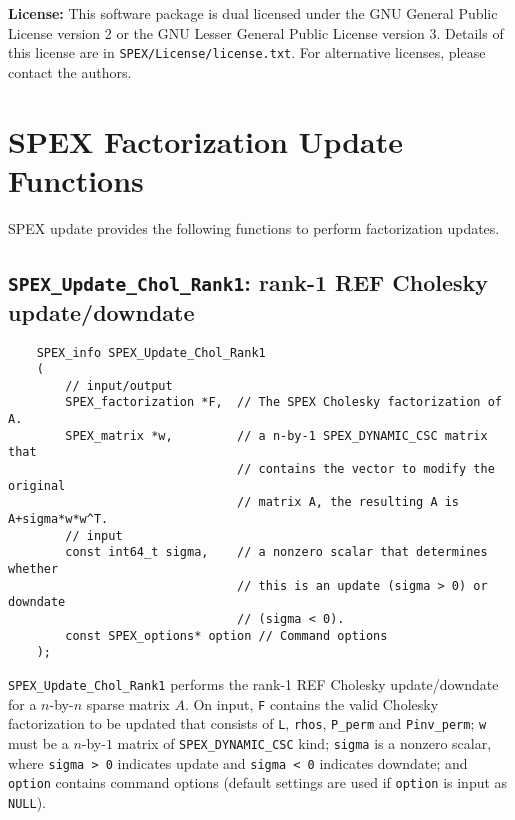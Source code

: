 \documentclass[12pt]{report}
\theoremstyle{definition}
\begin{document}
{\noindent \textbf{License:} This software package is dual licensed under the GNU General Public License version 2 or the GNU Lesser General Public License version 3. Details of this license are in \verb|SPEX/License/license.txt|. For alternative licenses, please contact the authors.

\section{SPEX Factorization Update Functions} 
SPEX update provides the following functions to perform factorization updates.

\subsection{\texttt{SPEX\_Update\_Chol\_Rank1}: rank-1 REF Cholesky update/downdate}\label{ss:SPEX_Update_Chol_Rank1}

\begin{mdframed}[userdefinedwidth=6in]
{\footnotesize
\begin{verbatim}
    SPEX_info SPEX_Update_Chol_Rank1
    (
        // input/output
        SPEX_factorization *F,  // The SPEX Cholesky factorization of A. 
        SPEX_matrix *w,         // a n-by-1 SPEX_DYNAMIC_CSC matrix that
                                // contains the vector to modify the original
                                // matrix A, the resulting A is A+sigma*w*w^T. 
        // input
        const int64_t sigma,    // a nonzero scalar that determines whether
                                // this is an update (sigma > 0) or downdate
                                // (sigma < 0).
        const SPEX_options* option // Command options
    );
\end{verbatim}
} \end{mdframed}

\verb|SPEX_Update_Chol_Rank1| performs the rank-1 REF Cholesky update/downdate for a $n$-by-$n$ sparse matrix $A$. On input, \verb|F| contains the valid Cholesky factorization to be updated that consists of \verb|L|, \verb|rhos|, \verb|P_perm| and \verb|Pinv_perm|; \verb|w| must be a $n$-by-$1$  matrix of \verb|SPEX_DYNAMIC_CSC| kind; \verb|sigma| is a nonzero scalar, where \verb|sigma > 0| indicates update and \verb|sigma < 0| indicates downdate; and \verb|option| contains command options (default settings are used if \verb|option| is input as \verb|NULL|).

}
\end{document}
